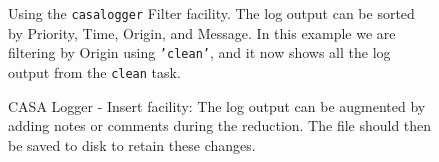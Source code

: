 
\begin{figure}[h]
\begin{center}
\caption{\label{fig:logger_filter} Using the {\tt casalogger} Filter
facility.  The log output can be sorted by Priority, Time, Origin, and
Message.  In this example we are filtering by Origin using {\tt 'clean'},
and it now shows all the log output from the {\tt clean} task.}  
\hrulefill
\end{center}
\end{figure}

\begin{figure}[h]
\begin{center}
\caption{\label{fig:logger_insert} CASA Logger - Insert facility: The
log output can be augmented by adding notes or comments during the
reduction. The file should then be saved to disk to retain these
changes.}
\hrulefill
\end{center}
\end{figure}

